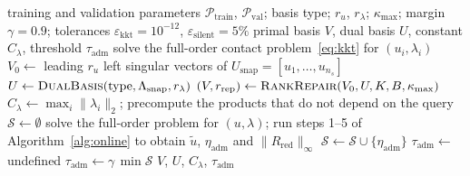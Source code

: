 \documentclass[11pt,a4paper]{article}
\begin{document}
\begin{algorithm}[htbp]\small
\caption{Offline stage: reduced model and calibrated admissibility threshold.}\label{alg:offline}
\begin{algorithmic}[1]
\Require training and validation parameters $\mathcal{P}_{\mathrm{train}}$, $\mathcal{P}_{\mathrm{val}}$; basis type; $r_u$, $r_\lambda$; $\kappa_{\max}$; margin $\gamma=0.9$; tolerances $\varepsilon_{\mathrm{kkt}}=10^{-12}$, $\varepsilon_{\mathrm{silent}}=5\%$
\Ensure primal basis $V$, dual basis $U$, constant $C_\lambda$, threshold $\tau_{\mathrm{adm}}$
  \State solve the full-order contact problem~\eqref{eq:kkt} for $(u_i,\lambda_i)$
\EndFor
\State $V_0\gets$ leading $r_u$ left singular vectors of $U_{\mathrm{snap}}=[u_1,\dots,u_{n_s}]$
\State $U\gets\textsc{DualBasis}(\text{type},\Lambda_{\mathrm{snap}},r_\lambda)$ 
\State $(V,r_{\mathrm{rep}})\gets\textsc{RankRepair}(V_0,U,K,B,\kappa_{\max})$ 
\State $C_\lambda\gets\max_i\|\lambda_i\|_2$; precompute the products that do not depend on the query
\State $\mathcal{S}\gets\emptyset$
  \State solve the full-order problem for $(u,\lambda)$; run steps 1--5 of Algorithm~\ref{alg:online} to obtain $\tilde u$, $\eta_{\mathrm{adm}}$ and $\|R_{\mathrm{red}}\|_\infty$
   
    \State $\mathcal{S}\gets\mathcal{S}\cup\{\eta_{\mathrm{adm}}\}$
  \EndIf
\EndFor
{}
  \State $\tau_{\mathrm{adm}}\gets$ undefined 
\Else
  \State $\tau_{\mathrm{adm}}\gets\gamma\,\min\mathcal{S}$
\EndIf
\State \Return $V$, $U$, $C_\lambda$, $\tau_{\mathrm{adm}}$
\end{algorithmic}
\end{algorithm}
\end{document}
